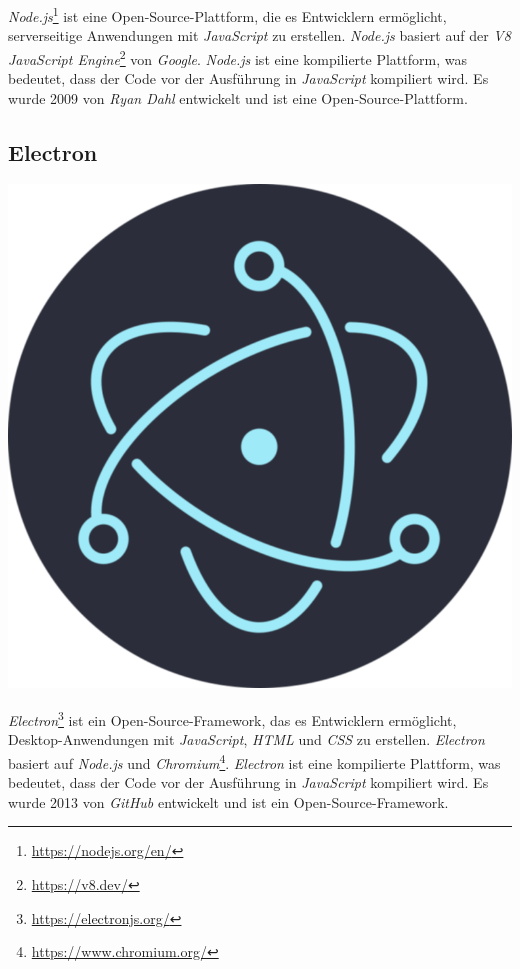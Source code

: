 \emph{Node.js}\footnote{\url{https://nodejs.org/en/}} ist eine Open-Source-Plattform, die es Entwicklern ermöglicht, serverseitige Anwendungen mit \emph{JavaScript} zu erstellen.
\emph{Node.js} basiert auf der \emph{V8 JavaScript Engine}\footnote{\url{https://v8.dev/}} von \emph{Google}.
\emph{Node.js} ist eine kompilierte Plattform, was bedeutet, dass der Code vor der Ausführung in \emph{JavaScript} kompiliert wird.
Es wurde 2009 von \emph{Ryan Dahl} entwickelt und ist eine Open-Source-Plattform.

\subsection{Electron}\label{subsec:electron}

\includegraphics[scale=0.066]{assets/electron}

\emph{Electron}\footnote{\url{https://electronjs.org/}} ist ein Open-Source-Framework, das es Entwicklern ermöglicht, Desktop-Anwendungen mit \emph{JavaScript}, \emph{HTML} und \emph{CSS} zu erstellen.
\emph{Electron} basiert auf \emph{Node.js} und \emph{Chromium}\footnote{\url{https://www.chromium.org/}}.
\emph{Electron} ist eine kompilierte Plattform, was bedeutet, dass der Code vor der Ausführung in \emph{JavaScript} kompiliert wird.
Es wurde 2013 von \emph{GitHub} entwickelt und ist ein Open-Source-Framework.

